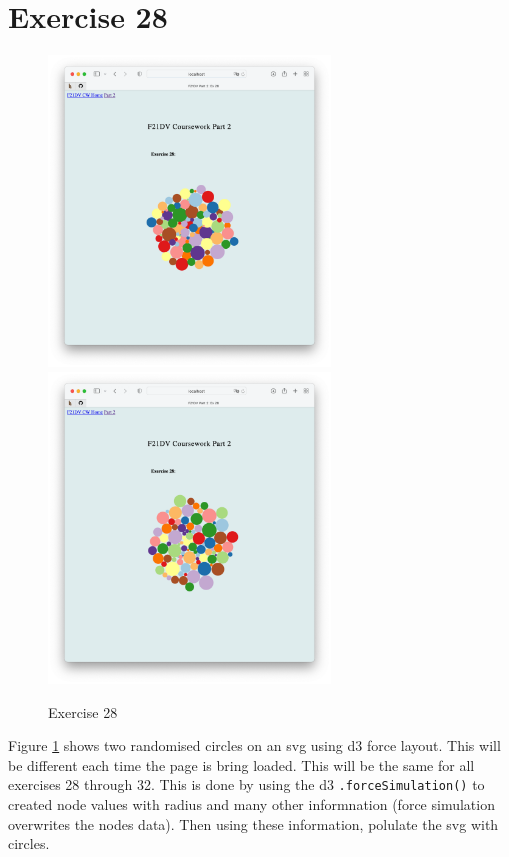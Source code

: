 \documentclass{scrreprt}
\begin{document}
\section{Exercise 28}
\begin{figure}[!ht]
    \centering
    \includegraphics[width = 7.5cm]{images/ex28_1.png}
    \includegraphics[width = 7.5cm]{images/ex28_2.png}
    \label{fig:ex28}
    \caption{Exercise 28}
\end{figure}
\FloatBarrier
% 
Figure \ref{fig:ex28} shows two randomised circles on an svg using d3 force layout. This will be different each time the page is bring loaded. This will be the same for all exercises 28 through 32. This is done by using the d3 \verb|.forceSimulation()| to created node values with radius and many other informnation (force simulation overwrites the nodes data). Then using these information, polulate the svg with circles.
\end{document}
